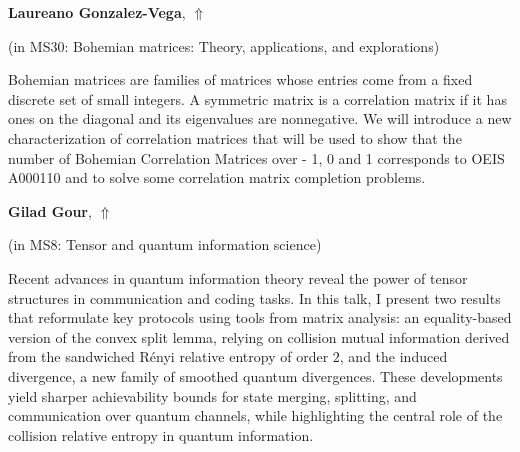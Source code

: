 \documentclass[ILAS2025-program.tex]{subfiles}
\begin{document}
\hypertarget{down0230}{}\begin{ilasabstract}
    
\textbf{Laureano Gonzalez-Vega},  \hfill \hyperlink{up0230}{$\Uparrow$}
    
    
(in {\color{mstitle}MS30: Bohemian matrices: Theory, applications, and explorations})
        
\mtskip
    Bohemian matrices are families of matrices whose entries come from a fixed discrete set of
small integers. A symmetric matrix is a correlation matrix if it has ones on the diagonal and
its eigenvalues are nonnegative. We will introduce a new characterization of correlation
matrices that will be used to show that the number of Bohemian Correlation Matrices over -
1, 0 and 1 corresponds to OEIS A000110 and to solve some correlation matrix completion
problems.
\end{ilasabstract}
    

\hypertarget{down0053}{}\begin{ilasabstract}
    
\textbf{Gilad Gour},  \hfill \hyperlink{up0053}{$\Uparrow$}
    
    
(in {\color{mstitle}MS8: Tensor and quantum information science})
        
\mtskip
    Recent advances in quantum information theory reveal the power of tensor structures in communication and coding tasks. In this talk, I present two results that reformulate key protocols using tools from matrix analysis: an equality-based version of the convex split lemma, relying on collision mutual information derived from the sandwiched R\'enyi relative entropy of order $2$, and the induced divergence, a new family of smoothed quantum divergences. These developments yield sharper achievability bounds for state merging, splitting, and communication over quantum channels, while highlighting the central role of the collision relative entropy in quantum information.
\end{ilasabstract}
    
\end{document}
